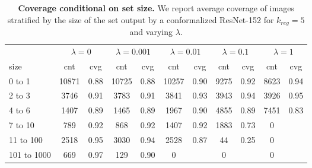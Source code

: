 \begin{table}[t]
\centering
\small
\begin{tabular}{lcccccccccc} 
\toprule
         & \multicolumn{2}{c}{$\lambda={0}$}     & \multicolumn{2}{c}{$\lambda={0.001}$}     & \multicolumn{2}{c}{$\lambda={0.01}$}     & \multicolumn{2}{c}{$\lambda={0.1}$}     & \multicolumn{2}{c}{$\lambda={1}$}    \\ 
         \cmidrule(r){2-3}     \cmidrule(r){4-5}     \cmidrule(r){6-7}     \cmidrule(r){8-9}     \cmidrule(r){10-11}    
size &cnt &cvg &cnt &cvg &cnt &cvg &cnt &cvg &cnt &cvg \\ 
\midrule 
0 to 1      & 10871 & 0.88 & 10725 & 0.88 & 10257 & 0.90 & 9275 & 0.92 & 8623 & 0.94\\ 
2 to 3      & 3746 & 0.91 & 3783 & 0.91 & 3841 & 0.93 & 3943 & 0.94 & 3926 & 0.95\\ 
4 to 6      & 1407 & 0.89 & 1465 & 0.89 & 1967 & 0.90 & 4855 & 0.89 & 7451 & 0.83\\ 
7 to 10      & 789 & 0.92 & 868 & 0.92 & 1407 & 0.92 & 1883 & 0.73 & 0 & \\ 
11 to 100      & 2518 & 0.95 & 3030 & 0.94 & 2528 & 0.87 & 44 & 0.25 & 0 & \\ 
101 to 1000      & 669 & 0.97 & 129 & 0.90 & 0 &  & 0 &  & 0 & \\ 
\bottomrule
\end{tabular}
\caption{\textbf{Coverage conditional on set size.} We report average coverage of images stratified by the size of the set output by a conformalized ResNet-152 for $k_{reg}=5$ and varying $\lambda$.}
\label{table:adaptiveness}
\end{table}

